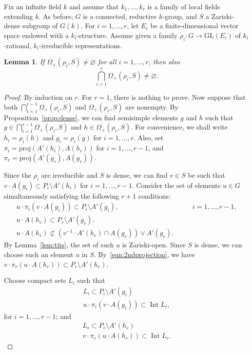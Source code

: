 \documentclass{amsart}
\theoremstyle{plain}
\newtheorem{lemma}[theorem]{Lemma}
\theoremstyle{definition}
\theoremstyle{remark}
\DeclareMathOperator{\Int}{Int}
\begin{document}
Fix an infinite field $k$ and assume
that $k_{1},\ldots, k_{r}$ is a family of local fields extending $k$.
As before, $G$ is a connected, reductive $k$-group, and $S$ a
Zariski-dense subgroup of $G(k)$.  For $i = 1,\ldots, r$, let
$E_{i}$ be a finite-dimensional vector space endowed with a $k_{i}$-structure.
Assume given a family $\rho_{i}: G \to
\mathrm{GL}(E_{i})$ of $k_{i}$-rational, $k_{i}$-irreducible representations.
\begin{lemma}\label{lem:simprox}
If $\Omega_{+}(\rho_{i}, S) \neq\varnothing$ for all $i = 1,\ldots, r$, then
also $$\bigcap_{i = 1}^{r} \Omega_{+}(\rho_{i}, S)\neq\varnothing.$$
\end{lemma}
\begin{proof}
By induction on $r$. For $r = 1$, there is nothing to prove. Now suppose that both
$\bigcap_{i = 1}^{r - 1} \Omega_{+}(\rho_{i}, S)$ and $\Omega_{+}(\rho_{r}, S)$ are nonempty.
By Proposition~\ref{prop:dense}, we can find semisimple elements $g$ and $h$
such that $g \in \bigcap_{i = 1}^{r - 1} \Omega_{+}(\rho_{i}, S)$ and
$h \in \Omega_{+}(\rho_{r}, S)$. For convenience, we shall write $h_{i} = \rho_{i}(h)$
and $g_{i} = \rho_{i}(g)$ for $i=1,\ldots, r$. Also, set
$\pi_{i} = \mathrm{proj}(A'(h_{i}), A(h_{i}))$ for $i=1,\ldots, r -1$, and
 $\pi_{r} = \mathrm{proj}(A'(g_{r}), A(g_{r}))$.
 
Since the $\rho_{i}$ are irreducible and $S$ is dense, we can find $v \in S$ be such
that $v\cdot A(g_{i})
\subset P_{i}\setminus A'(h_{i})$ for $i = 1,\ldots, r-1$.
Consider the set of elements $u\in G$ simultaneously satisfying the following $r+1$
conditions:
\begin{align}
u\cdot \pi_{i}(v\cdot A(g_{i}))\subset P_{i}\setminus A'(g_{i}),& \qquad i =1,\ldots,
r-1, \nonumber\\
u\cdot A(h_{r})\subset P_{r}\setminus A'(g_{r}).&\nonumber\\
u\cdot A(h_{r}) \not\subset (v^{-1}\cdot A'(h_{r})\cap A(g_{r}))\vee A'(g_{r}).
\label{eqn:2ndprojection}
\end{align} 
By Lemma~\ref{lem:tits}, the set of such $u$ is Zariski-open. Since $S$ is dense, we can choose such an element $u$ in $S$. By~\eqref{eqn:2ndprojection},
we have $v\cdot \pi_{r}(u\cdot A(h_{r})) \subset P_{r}\setminus A'(h_{r})$.

Choose compact sets $L_{i}$ such that
 \begin{gather*}
 L_{i} \subset P_{i}\setminus A'(g_{i})\\
 u\cdot \pi_{i}(v\cdot A(g_{i}))\subset \Int L_{i},
 \end{gather*}
 for $i = 1,\ldots, r-1$; and
 \begin{gather*}
 L_{r} \subset P_{r}\setminus A'(h_{r})\\
 v\cdot \pi_{r}(u\cdot A(h_{r}))\subset \Int L_{r}.
 \end{gather*}
 

\end{proof}
\end{document}
